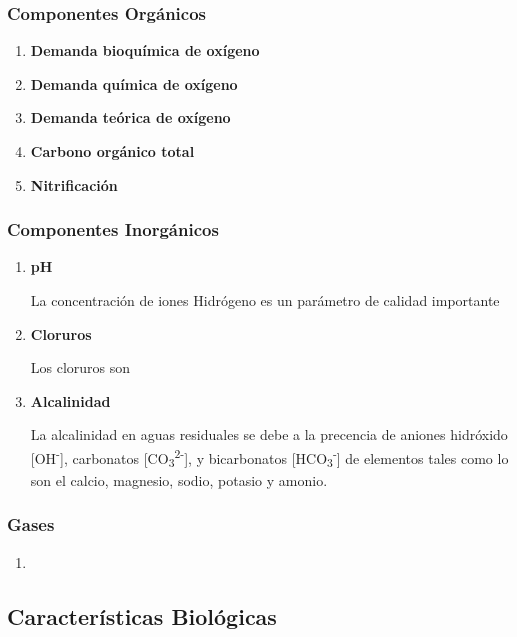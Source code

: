 \subsubsection{Componentes Orgánicos}
\begin{enumerate}[label=\textbf{\alph*{.-}}]
	\item \textbf{Demanda bioquímica de oxígeno}\par
	
	\item \textbf{Demanda química de oxígeno}\par
	
	\item \textbf{Demanda teórica de oxígeno}\par
	
	\item \textbf{Carbono orgánico total}\par
	
	\item \textbf{Nitrificación}\par
	
\end{enumerate}
\subsubsection{Componentes Inorgánicos}
\begin{enumerate}[label=\textbf{\alph*{.-}}]
	\item \textbf{pH}\par 
	La concentración de iones Hidrógeno es un parámetro de calidad importante
	\item \textbf{Cloruros}\par 
	Los cloruros son
	\item \textbf{Alcalinidad}\par
	La alcalinidad en aguas residuales se debe a la precencia de aniones hidróxido [OH\textsuperscript{-}], carbonatos [CO\textsubscript{3}\textsuperscript{2-}], y bicarbonatos [HCO\textsubscript{3}\textsuperscript{-}] de elementos tales como lo son el calcio, magnesio, sodio, potasio y amonio.
\end{enumerate}
\subsubsection{Gases}
\begin{enumerate}[label=\textbf{\alph*{.-}}]
	\item 
\end{enumerate}
\subsection{Características Biológicas}

